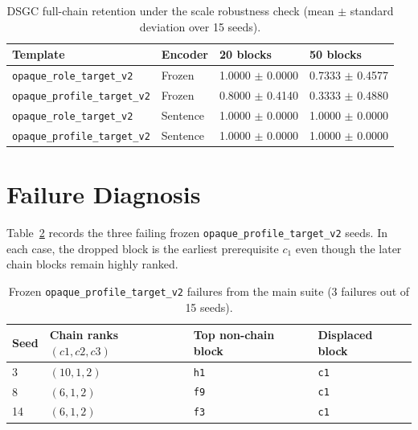 \documentclass[10pt]{article}
\begin{document}
\begin{table}[h]
  \centering
  \footnotesize
\begin{tabular}{llll}
\toprule
Template & Encoder & 20 blocks & 50 blocks \\
\midrule
\texttt{opaque\_role\_target\_v2} & Frozen & 1.0000 $\pm$ 0.0000 & 0.7333 $\pm$ 0.4577 \\
\texttt{opaque\_profile\_target\_v2} & Frozen & 0.8000 $\pm$ 0.4140 & 0.3333 $\pm$ 0.4880 \\
\texttt{opaque\_role\_target\_v2} & Sentence & 1.0000 $\pm$ 0.0000 & 1.0000 $\pm$ 0.0000 \\
\texttt{opaque\_profile\_target\_v2} & Sentence & 1.0000 $\pm$ 0.0000 & 1.0000 $\pm$ 0.0000 \\
\bottomrule
\end{tabular}
\caption{DSGC full-chain retention under the scale robustness check (mean $\pm$ standard deviation over 15 seeds).}
\label{tab:appendix-scale}
\end{table}

\section{Failure Diagnosis}

Table~\ref{tab:appendix-failures} records the three failing frozen
\texttt{opaque\_profile\_target\_v2} seeds. In each case, the dropped block is
the earliest prerequisite $c_1$ even though the later chain blocks remain
highly ranked.

\begin{table}[h]
  \centering
  \footnotesize
\begin{tabular}{llll}
\toprule
Seed & Chain ranks $(c1,c2,c3)$ & Top non-chain block & Displaced block \\
\midrule
3 & $(10,1,2)$ & \texttt{h1} & \texttt{c1} \\
8 & $(6,1,2)$ & \texttt{f9} & \texttt{c1} \\
14 & $(6,1,2)$ & \texttt{f3} & \texttt{c1} \\
\bottomrule
\end{tabular}
\caption{Frozen \texttt{opaque\_profile\_target\_v2} failures from the main suite (3 failures out of 15 seeds).}
\label{tab:appendix-failures}
\end{table}
\end{document}
